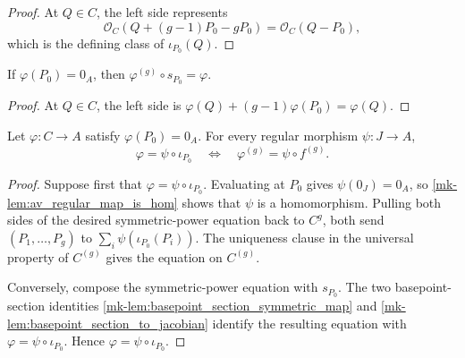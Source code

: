 \begin{proof}
  At \(Q\in C\), the left side represents
  \[
    \mathcal O_C(Q+(g-1)P_0-gP_0)=\mathcal O_C(Q-P_0),
  \]
  which is the defining class of \(\iota_{P_0}(Q)\).
\end{proof}

\begin{lemma}
  \label{mk-lem:basepoint_section_symmetric_map}

  If \(\varphi(P_0)=0_A\), then
  \(\varphi^{(g)}\circ s_{P_0}=\varphi\).
\end{lemma}

\begin{proof}
  At \(Q\in C\), the left side is
  \(\varphi(Q)+(g-1)\varphi(P_0)=\varphi(Q)\).
\end{proof}

\begin{lemma}
  \label{mk-lem:albanese_eq_iff_symmetricPower_eq}


  Let \(\varphi\colon C\to A\) satisfy \(\varphi(P_0)=0_A\).  For every
  regular morphism \(\psi\colon J\to A\),
  \[
    \varphi=\psi\circ\iota_{P_0}
      \quad\Longleftrightarrow\quad
    \varphi^{(g)}=\psi\circ f^{(g)}.
  \]
\end{lemma}

\begin{proof}
  Suppose first that \(\varphi=\psi\circ\iota_{P_0}\).  Evaluating at
  \(P_0\) gives \(\psi(0_J)=0_A\), so
  \ref{mk-lem:av_regular_map_is_hom} shows that \(\psi\) is a homomorphism.
  Pulling both sides of the desired symmetric-power equation back to
  \(C^g\), both send \((P_1,\ldots,P_g)\) to
  \(\sum_i\psi(\iota_{P_0}(P_i))\).  The uniqueness clause in the
  universal property of \(C^{(g)}\) gives the equation on \(C^{(g)}\).

  Conversely, compose the symmetric-power equation with
  \(s_{P_0}\).  The two basepoint-section identities
  \ref{mk-lem:basepoint_section_symmetric_map} and
  \ref{mk-lem:basepoint_section_to_jacobian} identify the resulting equation
  with \(\varphi=\psi\circ\iota_{P_0}\).  Hence
  \(\varphi=\psi\circ\iota_{P_0}\).
\end{proof}

